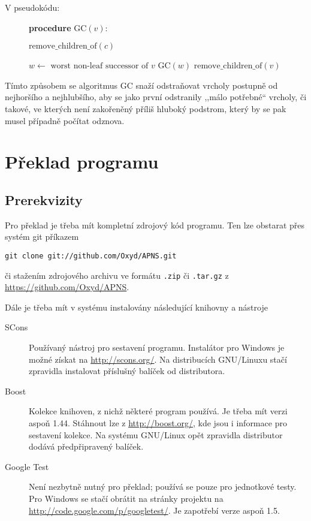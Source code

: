 \documentclass{article}
\begin{document}
V pseudokódu:
\begin{figure}[H]
{\bf procedure} \(\text{GC}(v)\):
\begin{algorithmic}
      \STATE \(\text{remove\_children\_of}(c)\)
    \ENDIF
  \ENDFOR
  
    \STATE \(w \gets \text{ worst non-leaf successor of } v\)
      \STATE \(\text{GC}(w)\)
    \ELSE
      \STATE \(\text{remove\_children\_of}(v)\)
    \ENDIF
  \ENDWHILE
\end{algorithmic}
\end{figure}

Tímto způsobem se algoritmus GC snaží odstraňovat vrcholy postupně od nejhoršího 
a nejhlubšího, aby se jako první odstranily ,,málo potřebné`` vrcholy, či 
takové, ve kterých není zakořeněný příliš hluboký podstrom, který by se pak
musel případně počítat odznova.

\section{Překlad programu}
\label{sec:compiling}

\subsection{Prerekvizity}
Pro překlad je třeba mít kompletní zdrojový kód programu. Ten lze obstarat přes
systém git příkazem
\begin{center}\texttt{git clone git://github.com/Oxyd/APNS.git}\end{center} či
stažením zdrojového archivu ve formátu
\texttt{.zip} či \texttt{.tar.gz} z \url{https://github.com/Oxyd/APNS}.

Dále je třeba mít v systému instalovány následující knihovny a
nástroje\begin{description}
\item[SCons] Používaný nástroj pro sestavení programu. Instalátor pro Windows je
  možné získat na
  \url{http://scons.org/}. Na distribucích GNU/Linuxu stačí zpravidla instalovat 
  příslušný balíček od distributora.
\item[Boost] Kolekce knihoven, z nichž některé program používá. Je třeba mít
  verzi aspoň 1.44. Stáhnout lze z
  \url{http://boost.org/}, kde jsou i informace pro sestavení kolekce. Na 
  systému GNU/Linux opět zpravidla distributor dodává předpřipravený balíček.
\item[Google Test] Není nezbytně nutný pro překlad; používá se pouze pro
  jednotkové testy. Pro Windows se stačí obrátit na stránky projektu na
  \url{http://code.google.com/p/googletest/}. Je zapotřebí verze aspoň 1.5.
\end{description}
\end{document}
